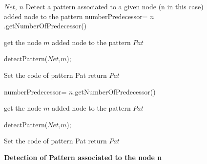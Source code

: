 
\begin{figure}[!t]
\begin{algorithmic}[1]
\REQUIRE $Net$, $n$
\ENSURE Detect a pattern associated to a given node (n in this case)
\STATE 
\STATE 
{}
   \STATE added node to the pattern
   \STATE numberPredecessor= $n$.getNumberOfPredecessor() 
   
    \STATE get the node $m$
      \STATE added node to the pattern $Pat$
    \ENDCASE
    
      \STATE detectPattern($Net$,$m$);
    \ENDCASE
    
    \ENDSWITCH
   \ENDFOR
      \STATE Set the code of pattern Pat
      \STATE return $Pat$
   \ENDCASE
   
   \ENDSWITCH
\ENDCASE
   
   \STATE numberPredecessor= $n$.getNumberOfPredecessor() 
   
    \STATE get the node $m$
      \STATE added node to the pattern $Pat$
    \ENDCASE
    
      \STATE detectPattern($Net$,$m$);
    \ENDCASE
    
    \ENDSWITCH
   \ENDFOR
      \STATE Set the code of pattern Pat
      \STATE return $Pat$
   \ENDCASE
   
   \ENDSWITCH
\ENDCASE
\ENDSWITCH
\end{algorithmic}
\caption{\bf Detection of Pattern associated to the node n}\label{PatternDetectionNode}
\end{figure}



